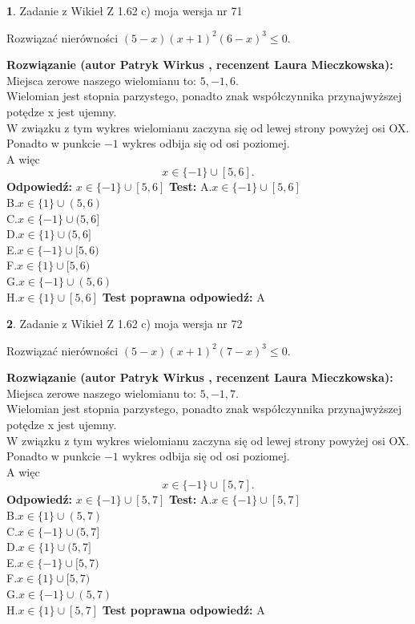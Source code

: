 \documentclass[12pt, a4paper]{article}
\theoremstyle{definition} %
\newtheorem{zad}{}
\newcommand{\zadStart}[1]{\begin{zad}#1\newline}
\newcommand{\zadStop}{\end{zad}}
\newcommand{\rozwStart}[2]{\noindent \textbf{Rozwiązanie (autor #1 , recenzent #2): }\newline}
\newcommand{\rozwStop}{\newline}
\newcommand{\odpStart}{\noindent \textbf{Odpowiedź:}\newline}
\newcommand{\odpStop}{\newline}
\newcommand{\testStart}{\noindent \textbf{Test:}\newline}
\newcommand{\testStop}{\newline}
\newcommand{\kluczStart}{\noindent \textbf{Test poprawna odpowiedź:}\newline}
\newcommand{\kluczStop}{\newline}
\begin{document}
\zadStart{Zadanie z Wikieł Z 1.62 c) moja wersja nr 71}

Rozwiązać nierówności $(5-x)(x+1)^{2}(6-x)^{3}\le0$.
\zadStop
\rozwStart{Patryk Wirkus}{Laura Mieczkowska}
Miejsca zerowe naszego wielomianu to: $5, -1, 6$.\\
Wielomian jest stopnia parzystego, ponadto znak współczynnika przy\linebreak najwyższej potędze x jest ujemny.\\ W związku z tym wykres wielomianu zaczyna się od lewej strony powyżej osi OX.\\
Ponadto w punkcie $-1$ wykres odbija się od osi poziomej.\\
A więc $$x \in \{-1\} \cup [5,6].$$
\rozwStop
\odpStart
$x \in \{-1\} \cup [5,6]$
\odpStop
\testStart
A.$x \in \{-1\} \cup [5,6]$\\
B.$x \in \{1\} \cup (5,6)$\\
C.$x \in \{-1\} \cup (5,6]$\\
D.$x \in \{1\} \cup (5,6]$\\
E.$x \in \{-1\} \cup [5,6)$\\
F.$x \in \{1\} \cup [5,6)$\\
G.$x \in \{-1\} \cup (5,6)$\\
H.$x \in \{1\} \cup [5,6]$
\testStop
\kluczStart
A
\kluczStop



\zadStart{Zadanie z Wikieł Z 1.62 c) moja wersja nr 72}

Rozwiązać nierówności $(5-x)(x+1)^{2}(7-x)^{3}\le0$.
\zadStop
\rozwStart{Patryk Wirkus}{Laura Mieczkowska}
Miejsca zerowe naszego wielomianu to: $5, -1, 7$.\\
Wielomian jest stopnia parzystego, ponadto znak współczynnika przy\linebreak najwyższej potędze x jest ujemny.\\ W związku z tym wykres wielomianu zaczyna się od lewej strony powyżej osi OX.\\
Ponadto w punkcie $-1$ wykres odbija się od osi poziomej.\\
A więc $$x \in \{-1\} \cup [5,7].$$
\rozwStop
\odpStart
$x \in \{-1\} \cup [5,7]$
\odpStop
\testStart
A.$x \in \{-1\} \cup [5,7]$\\
B.$x \in \{1\} \cup (5,7)$\\
C.$x \in \{-1\} \cup (5,7]$\\
D.$x \in \{1\} \cup (5,7]$\\
E.$x \in \{-1\} \cup [5,7)$\\
F.$x \in \{1\} \cup [5,7)$\\
G.$x \in \{-1\} \cup (5,7)$\\
H.$x \in \{1\} \cup [5,7]$
\testStop
\kluczStart
A
\kluczStop
\end{document}
